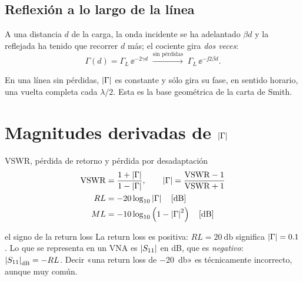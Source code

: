 \subsection{Reflexión a lo largo de la línea}
A una distancia $d$ de la carga, la onda incidente se ha adelantado $\beta d$ y la reflejada ha tenido que recorrer $d$ más; el cociente gira
\emph{dos veces}:
\begin{equation}
  \Gamma(d) = \Gamma_L\,\ee^{-2\gamma d} \;\xrightarrow{\text{sin pérdidas}}\; \Gamma_L\,\ee^{-\jj 2\beta d}.
\end{equation}
\begin{donde}
\end{donde}
En una línea sin pérdidas, $\left|\Gamma\right|$ es constante y sólo gira su fase, en sentido horario, una vuelta completa cada $\lambda/2$.
Esta es la base geométrica de la carta de Smith.

\section{\texorpdfstring{Magnitudes derivadas de $\left|\Gamma\right|$}{Magnitudes derivadas de |Γ|}}

\begin{definicion}{VSWR, pérdida de retorno y pérdida por desadaptación}
\begin{align}
  \mathrm{VSWR} &= \frac{1+\abs\Gamma}{1-\abs\Gamma}, \qquad \abs\Gamma = \frac{\mathrm{VSWR}-1}{\mathrm{VSWR}+1}\\
  RL &= -20\log_{10}\abs\Gamma \quad [\si{\decibel}]\\
  ML &= -10\log_{10}\left(1 - \abs\Gamma^2\right) \quad [\si{\decibel}]
\end{align}
\begin{donde}
\end{donde}
\end{definicion}

\begin{atencion}{el signo de la return loss}
La return loss es positiva: $RL = \SI{20}{\decibel}$ significa $\left|\Gamma\right| = 0.1$. Lo que se representa en un VNA es $\left|S_{11}\right|$ en dB,
que es \emph{negativo}: $\abs{S_{11}}_{\si{\decibel}} = -RL$. Decir «una return loss de \SI{-20}{\decibel}» es técnicamente incorrecto,
aunque muy común.
\end{atencion}

